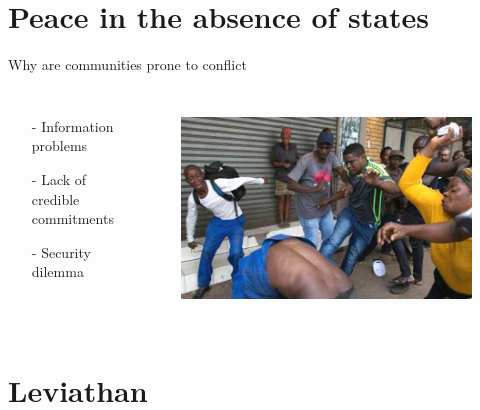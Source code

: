 \documentclass{beamer}
\begin{document}
\section{Peace in the absence of states}

\begin{frame}{Why are communities prone to conflict}

\begin{columns}
\begin{itemize}
	\item[-] Information problems \pause
	\item[-] Lack of credible commitments \pause
	\item[-] Security dilemma 
\end{itemize}	

\begin{figure}[htpb]
	\centering
	\includegraphics[width=\linewidth]{img/xenophobia.jpeg}
	\label{xeno}
\end{figure}
\end{columns}
\end{frame}


\section{Leviathan}
\end{document}
